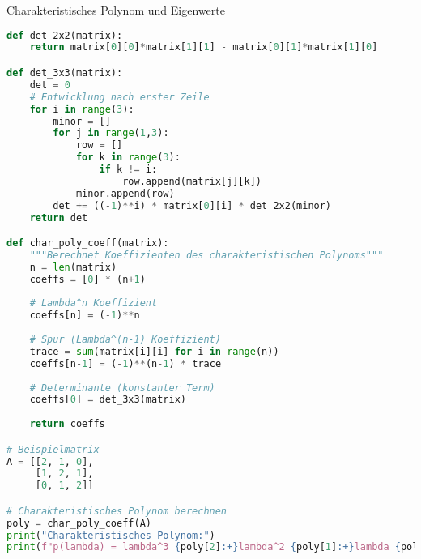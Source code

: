 \begin{examplecode}{Charakteristisches Polynom und Eigenwerte}
\begin{lstlisting}[language=Python, style=basesmol]
def det_2x2(matrix):
    return matrix[0][0]*matrix[1][1] - matrix[0][1]*matrix[1][0]

def det_3x3(matrix):
    det = 0
    # Entwicklung nach erster Zeile
    for i in range(3):
        minor = []
        for j in range(1,3):
            row = []
            for k in range(3):
                if k != i:
                    row.append(matrix[j][k])
            minor.append(row)
        det += ((-1)**i) * matrix[0][i] * det_2x2(minor)
    return det

def char_poly_coeff(matrix):
    """Berechnet Koeffizienten des charakteristischen Polynoms"""
    n = len(matrix)
    coeffs = [0] * (n+1)
    
    # Lambda^n Koeffizient
    coeffs[n] = (-1)**n
    
    # Spur (Lambda^(n-1) Koeffizient)
    trace = sum(matrix[i][i] for i in range(n))
    coeffs[n-1] = (-1)**(n-1) * trace
    
    # Determinante (konstanter Term)
    coeffs[0] = det_3x3(matrix)
    
    return coeffs

# Beispielmatrix
A = [[2, 1, 0],
     [1, 2, 1],
     [0, 1, 2]]

# Charakteristisches Polynom berechnen
poly = char_poly_coeff(A)
print("Charakteristisches Polynom:")
print(f"p(lambda) = lambda^3 {poly[2]:+}lambda^2 {poly[1]:+}lambda {poly[0]:+}")
\end{lstlisting}
\end{examplecode}

